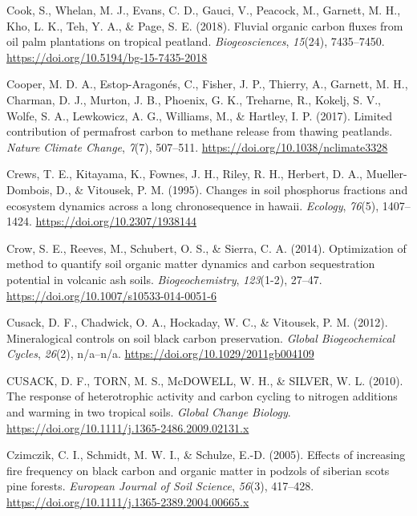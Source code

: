 \documentclass[]{article}
\begin{document}
\leavevmode\hypertarget{ref-Cook_2018}{}%
Cook, S., Whelan, M. J., Evans, C. D., Gauci, V., Peacock, M., Garnett,
M. H., Kho, L. K., Teh, Y. A., \& Page, S. E. (2018). Fluvial organic
carbon fluxes from oil palm plantations on tropical peatland.
\emph{Biogeosciences}, \emph{15}(24), 7435--7450.
\url{https://doi.org/10.5194/bg-15-7435-2018}

\leavevmode\hypertarget{ref-Cooper_2017}{}%
Cooper, M. D. A., Estop-Aragonés, C., Fisher, J. P., Thierry, A.,
Garnett, M. H., Charman, D. J., Murton, J. B., Phoenix, G. K., Treharne,
R., Kokelj, S. V., Wolfe, S. A., Lewkowicz, A. G., Williams, M., \&
Hartley, I. P. (2017). Limited contribution of permafrost carbon to
methane release from thawing peatlands. \emph{Nature Climate Change},
\emph{7}(7), 507--511. \url{https://doi.org/10.1038/nclimate3328}

\leavevmode\hypertarget{ref-Crews_1995}{}%
Crews, T. E., Kitayama, K., Fownes, J. H., Riley, R. H., Herbert, D. A.,
Mueller-Dombois, D., \& Vitousek, P. M. (1995). Changes in soil
phosphorus fractions and ecosystem dynamics across a long chronosequence
in hawaii. \emph{Ecology}, \emph{76}(5), 1407--1424.
\url{https://doi.org/10.2307/1938144}

\leavevmode\hypertarget{ref-Crow_2014}{}%
Crow, S. E., Reeves, M., Schubert, O. S., \& Sierra, C. A. (2014).
Optimization of method to quantify soil organic matter dynamics and
carbon sequestration potential in volcanic ash soils.
\emph{Biogeochemistry}, \emph{123}(1-2), 27--47.
\url{https://doi.org/10.1007/s10533-014-0051-6}

\leavevmode\hypertarget{ref-Cusack_2012}{}%
Cusack, D. F., Chadwick, O. A., Hockaday, W. C., \& Vitousek, P. M.
(2012). Mineralogical controls on soil black carbon preservation.
\emph{Global Biogeochemical Cycles}, \emph{26}(2), n/a--n/a.
\url{https://doi.org/10.1029/2011gb004109}

\leavevmode\hypertarget{ref-CUSACK_2010}{}%
CUSACK, D. F., TORN, M. S., McDOWELL, W. H., \& SILVER, W. L. (2010).
The response of heterotrophic activity and carbon cycling to nitrogen
additions and warming in two tropical soils. \emph{Global Change
Biology}. \url{https://doi.org/10.1111/j.1365-2486.2009.02131.x}

\leavevmode\hypertarget{ref-Czimczik_2005}{}%
Czimczik, C. I., Schmidt, M. W. I., \& Schulze, E.-D. (2005). Effects of
increasing fire frequency on black carbon and organic matter in podzols
of siberian scots pine forests. \emph{European Journal of Soil Science},
\emph{56}(3), 417--428.
\url{https://doi.org/10.1111/j.1365-2389.2004.00665.x}
\end{document}
